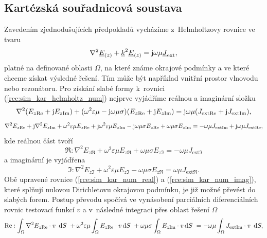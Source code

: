 \subsection{Kartézská souřadnicová soustava} \label{subsec:sim_kar}
Zavedením zjednodušujících předpokladů vycházíme z~Helmholtzovy rovnice ve tvaru
\begin{equation}
	\nabla^{2}{\underline{E}}_{(z)} +{\underline{k}}^{2}{\underline{E}}_{(z)} = \mathrm{j}\omega\mu{\underline{J}}_{\mathrm{ext}},
	\label{rce:sim_kar_helmholtz_num} 
\end{equation}
platné na definované oblasti $\Omega$, na které známe okrajové podmínky a ve které chceme získat výsledné řešení. Tím může být například vnitřní prostor vlnovodu nebo rezonátoru. Pro získání slabé formy k~rovnici (\ref{rce:sim_kar_helmholtz_num}) nejprve vyjádříme reálnou a imaginární složku
\begin{displaymath}
	\nabla^{2}(E_{z\mathrm{Re}} + \mathrm{j} E_{z\mathrm{Im}}) + (\omega^{2}\varepsilon\mu - \mathrm{j}\omega\mu\sigma)(E_{z\mathrm{Re}} + \mathrm{j} E_{z\mathrm{Im}}) = \mathrm{j}\omega\mu (J_{\mathrm{ext}\mathrm{Re}} + \mathrm{j} J_{\mathrm{ext}\mathrm{Im}}),
\end{displaymath}
\begin{displaymath}
	\nabla^{2} E_{z\mathrm{Re}} + \mathrm{j}\nabla^{2} E_{z\mathrm{Im}} + \omega^{2}\varepsilon\mu E_{z\mathrm{Re}} + \mathrm{j}\omega^{2}\varepsilon\mu E_{z\mathrm{Im}} - \mathrm{j}\omega\mu\sigma E_{z\mathrm{Re}} + \omega\mu\sigma E_{z\mathrm{Im}} = - \omega\mu J_{\mathrm{ext}\mathrm{Im}} + \mathrm{j}\omega\mu J_{\mathrm{ext}\mathrm{Re}},
\end{displaymath}
kde reálnou část tvoří
\begin{equation}
	\Re : \nabla^{2} E_{z\Re} + \omega^{2}\varepsilon\mu E_{z\Re} + \omega\mu\sigma E_{z\Im} = - \omega\mu J_{\mathrm{ext}\Im}
	\label{rce:sim_kar_num_real} 
\end{equation}
a imaginární je vyjádřena
\begin{equation}
	\Im : \nabla^{2} E_{z\Im} + \omega^{2}\varepsilon\mu E_{z\Im} - \omega\mu\sigma E_{z\Re} = \omega\mu J_{\mathrm{ext}\Re}.
	\label{rce:sim_kar_num_imag} 
\end{equation}
Obě upravené rovnice (\ref{rce:sim_kar_num_real}) a (\ref{rce:sim_kar_num_imag}), které splňují nulovou Dirichletovu okrajovou podmínku, je již možné převést do slabých forem. Postup převodu spočívá ve vynásobení parciálních diferenciálních rovnic testovací funkcí $v$ a v~následné integraci přes oblast řešení $\Omega$ 
\begin{equation}
	\mathrm{Re} : \int_{\Omega}\nabla^{2} E_{z\mathrm{Re}}\cdot v~\,\mathrm{d} S~+ \omega^{2}\varepsilon\mu\int_{\Omega} E_{z\mathrm{Re}}\cdot v\,\mathrm{d} S~+ \omega\mu\sigma\int_{\Omega} E_{z\mathrm{Im}}\cdot v\,\mathrm{d} S~= - \omega\mu \int_{\Omega}J_{\mathrm{ext}\mathrm{Im}}\cdot v~\,\mathrm{d} S,
	\label{rce:sim_kar_weak_odv_real} 
\end{equation}
